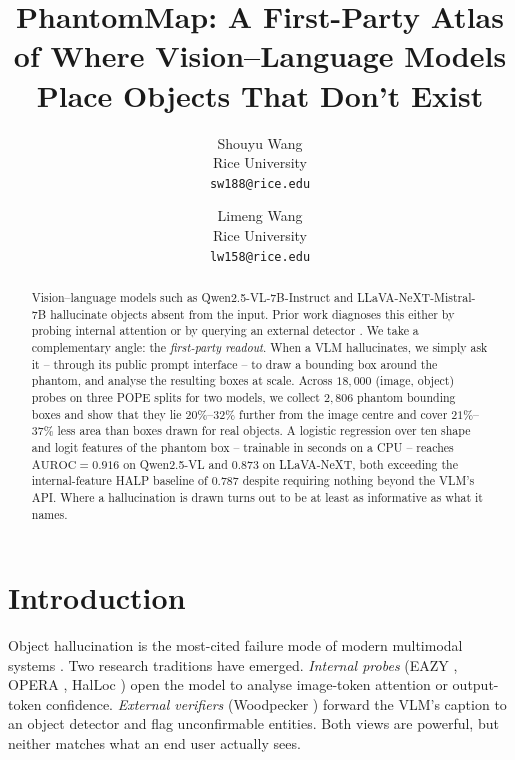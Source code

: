 \documentclass[10pt,twocolumn,letterpaper]{article}
\begin{document}
\title{PhantomMap: A First-Party Atlas of Where Vision--Language Models Place Objects That Don't Exist}

\author{%
  Shouyu Wang \\
  Rice University\\
  {\tt\small sw188@rice.edu}
  \and
  Limeng Wang \\
  Rice University\\
  {\tt\small lw158@rice.edu}
}

\maketitle

\begin{abstract}
   Vision--language models such as Qwen2.5-VL-7B-Instruct
   \cite{qwen25vl} and LLaVA-NeXT-Mistral-7B \cite{llavanext}
   hallucinate objects absent from the input. Prior work diagnoses
   this either by probing internal attention \cite{eazy,opera,halloc}
   or by querying an external detector \cite{woodpecker}. We take a
   complementary angle: the \emph{first-party readout}. When a VLM
   hallucinates, we simply ask it -- through its public prompt
   interface -- to draw a bounding box around the phantom, and analyse
   the resulting boxes at scale. Across $18{,}000$ (image, object)
   probes on three POPE \cite{pope} splits for two models, we collect
   $2{,}806$ phantom bounding boxes and show that they lie
   $20\%$--$32\%$ further from the image centre and cover
   $21\%$--$37\%$ less area than boxes drawn for real objects.
   A logistic regression over ten shape and logit features of the
   phantom box -- trainable in seconds on a CPU -- reaches
   $\mathrm{AUROC}=0.916$ on Qwen2.5-VL and $0.873$ on LLaVA-NeXT,
   both exceeding the internal-feature HALP baseline of $0.787$
   \cite{halp} despite requiring nothing beyond the VLM's API. Where a
   hallucination is drawn turns out to be at least as informative as
   what it names.
\end{abstract}



\section{Introduction}

Object hallucination is the most-cited failure mode of modern
multimodal systems \cite{hallsurvey,pope}. Two research traditions
have emerged. \emph{Internal probes} (EAZY \cite{eazy}, OPERA
\cite{opera}, HalLoc \cite{halloc}) open the model to analyse
image-token attention or output-token confidence. \emph{External
verifiers} (Woodpecker \cite{woodpecker}) forward the VLM's caption to
an object detector and flag unconfirmable entities. Both views are
powerful, but neither matches what an end user actually sees.
\end{document}
